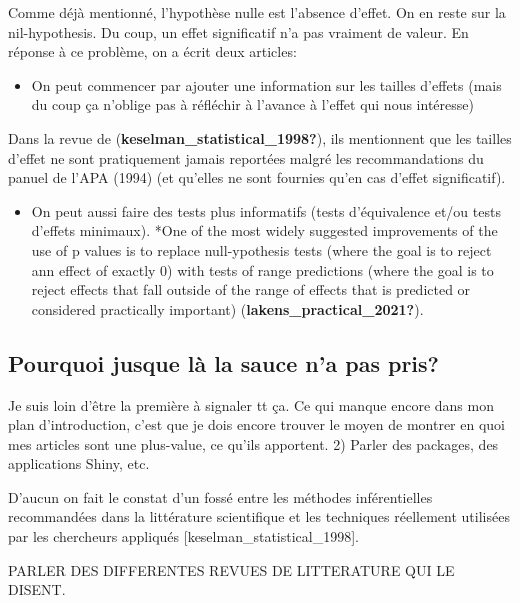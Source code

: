\documentclass[
  english,
  man]{apa6}
\providecommand{\tightlist}{%
  \setlength{\itemsep}{0pt}\setlength{\parskip}{0pt}}
\begin{document}
Comme déjà mentionné, l'hypothèse nulle est l'absence d'effet. On en reste sur la nil-hypothesis. Du coup, un effet significatif n'a pas vraiment de valeur. En réponse à ce problème, on a écrit deux articles:

\begin{itemize}
\tightlist
\item
  On peut commencer par ajouter une information sur les tailles d'effets (mais du coup ça n'oblige pas à réfléchir à l'avance à l'effet qui nous intéresse)
\end{itemize}

Dans la revue de (\textbf{keselman\_statistical\_1998?}), ils mentionnent que les tailles d'effet ne sont pratiquement jamais reportées malgré les recommandations du panuel de l'APA (1994) (et qu'elles ne sont fournies qu'en cas d'effet significatif).

\begin{itemize}
\tightlist
\item
  On peut aussi faire des tests plus informatifs (tests d'équivalence et/ou tests d'effets minimaux). *One of the most widely suggested improvements of the use of p values is to replace null-ypothesis tests (where the goal is to reject ann effect of exactly 0) with tests of range predictions (where the goal is to reject effects that fall outside of the range of effects that is predicted or considered practically important) (\textbf{lakens\_practical\_2021?}).
\end{itemize}

\hypertarget{pourquoi-jusque-luxe0-la-sauce-na-pas-pris}{%
\subsection{Pourquoi jusque là la sauce n'a pas pris?}\label{pourquoi-jusque-luxe0-la-sauce-na-pas-pris}}

Je suis loin d'être la première à signaler tt ça. Ce qui manque encore dans mon plan d'introduction, c'est que je dois encore trouver le moyen de montrer en quoi mes articles sont une plus-value, ce qu'ils apportent.
2) Parler des packages, des applications Shiny, etc.

D'aucun on fait le constat d'un fossé entre les méthodes inférentielles recommandées dans la littérature scientifique et les techniques réellement utilisées par les chercheurs appliqués {[}keselman\_statistical\_1998{]}.

PARLER DES DIFFERENTES REVUES DE LITTERATURE QUI LE DISENT.
\end{document}
